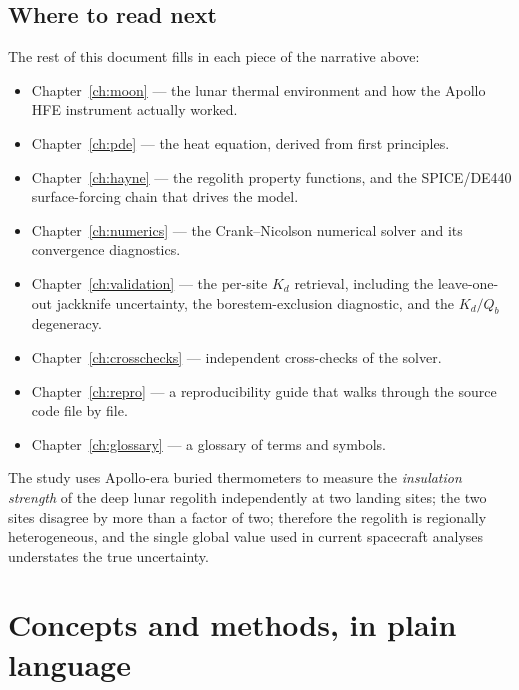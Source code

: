 \documentclass[11pt]{report}
\begin{document}
\section{Where to read next}

The rest of this document fills in each piece of the narrative
above:

\begin{itemize}\itemsep2pt
  \item Chapter~\ref{ch:moon} --- the lunar thermal environment
        and how the Apollo HFE instrument actually worked.
  \item Chapter~\ref{ch:pde} --- the heat equation, derived from
        first principles.
  \item Chapter~\ref{ch:hayne} --- the \citet{hayne2017} regolith
        property functions, and the SPICE/DE440 surface-forcing
        chain that drives the model.
  \item Chapter~\ref{ch:numerics} --- the Crank--Nicolson numerical
        solver and its convergence diagnostics.
  \item Chapter~\ref{ch:validation} --- the per-site $K_d$
        retrieval, including the leave-one-out jackknife
        uncertainty, the borestem-exclusion diagnostic, and the
        $K_d/Q_b$ degeneracy.
  \item Chapter~\ref{ch:crosschecks} --- independent cross-checks
        of the solver.
  \item Chapter~\ref{ch:repro} --- a reproducibility guide that
        walks through the source code file by file.
  \item Chapter~\ref{ch:glossary} --- a glossary of terms and
        symbols.
\end{itemize}

\begin{key}
The study uses Apollo-era buried thermometers to measure the
\emph{insulation strength} of the deep lunar regolith independently
at two landing sites; the two sites disagree by more than a factor of
two; therefore the regolith is regionally heterogeneous, and the
single global value used in current spacecraft analyses understates
the true uncertainty.
\end{key}

\chapter{Concepts and methods, in plain language}\label{ch:primer}
\end{document}
